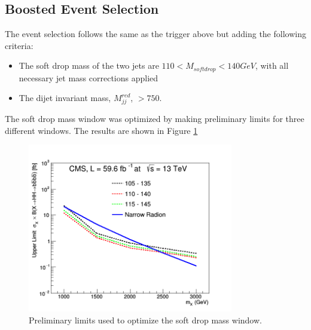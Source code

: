 \subsection{Boosted Event Selection\label{sec:EvtSel1p1}} 
The event selection follows the same as the trigger above but adding the following criteria:
\begin{itemize}
\item The soft drop mass of the two jets are $110 < M_{softdrop} < 140 GeV$, with all necessary jet mass corrections applied 
\item The dijet invariant mass, $M^{red}_{jj}$, $> 750$.
\end{itemize}
The soft drop mass window was optimized by making preliminary limits for three different windows. The results are shown in Figure \ref{fig:sdmasswindow} 
\begin{figure}[!htb]
	\centering
	\includegraphics[width=0.8\textwidth]{Figures/limits_HH_combine_59.6fb_softdropwindow_limit_comparison_RadNar.png}
	\caption{Preliminary limits used to optimize the soft drop mass window.}
	\label{fig:sdmasswindow}
\end{figure}

